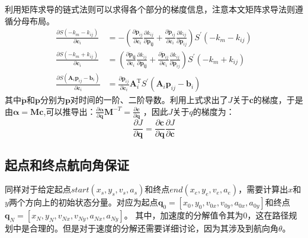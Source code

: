 \documentclass[master,academic]{ysuthesis} %
\begin{document}
		利用矩阵求导的链式法则可以求得各个部分的梯度信息，注意本文矩阵求导法则遵循分母布局。
		\begin{equation}
			\begin{aligned}
				\frac{\partial S( -k_m-k_{ij} )}{\partial \bm{c}_i}&=-( \frac{\partial \dot{\bm{p}}_{ij}}{\partial \bm{c}_i}\frac{\partial k_{ij}}{\partial \bm{\dot{\bm{p}}_{ij}}}+\frac{\partial \ddot{\bm{p}}_{ij}}{\partial \bm{c}_i}\frac{\partial k_{ij}}{\partial \ddot{\bm{p}}_{ij}} ) S^{'} ( -k_m-k_{ij} ) \\
				\frac{\partial S( -k_m+k_{ij} )}{\partial \bm{c}_i}&=( \frac{\partial \bm{\dot{\bm{p}}_{ij}}}{\partial \bm{c}_i}\frac{\partial k_{ij}}{\partial \bm{\dot{\bm{p}}_{ij}}}+\frac{\partial \ddot{\bm{p}}_{ij}}{\partial \bm{c}_i}\frac{\partial k_{ij}}{\partial \ddot{\bm{p}}_{ij}} ) S^{'} ( -k_m+k_{ij} ) \\
				\frac{\partial S( \bm{A}_i\bm{p}_{ij}-\bm{b}_{i} )}{\partial \bm{c}_i}&=\frac{\partial \bm{p}_{ij}}{\partial \bm{c}_i}\bm{A}_{i}^{\mathrm{T}}S^{'}( \bm{A}_i\bm{p}_{ij}-\bm{b}_{i} ) 
			\end{aligned}
		\end{equation}
		其中$\dot{\bm{p}}$和$\ddot{\bm{p}}$分别为$\bm{p}$对时间的一阶、二阶导数。利用上式求出了$J$关于$\bm{c}$的梯度，于是由$\bm{\alpha} = \bm{M}\bm{c}$,可以推导出：$\frac{\partial \bm{\alpha}}{\partial \bm{q}}\bm{M}^{-T}=\frac{\partial \bm{c}}{\partial \bm{q}}$ ，因此$J$关于$q$的梯度为：
		\begin{equation}
			\frac{\partial J}{\partial \bm{q}}=\frac{\partial \bm{c}}{\partial \bm{q}}\frac{\partial J}{\partial \bm{c}}
		\end{equation}

		\newpage
		\vspace*{-1.5em}

		\subsection{起点和终点航向角保证}
		同样对于给定起点$start(x_s,y_s,v_s,a_s)$和终点$end(x_e,y_e,v_e,a_e)$，需要计算出$x$和$y$两个方向上的初始状态分量。对应为起点$\bm{q}_{0}=[x_0,y_0,v_{0x},v_{0y},a_{0x},a_{0y}]$和终点$\bm{q}_{N}=[x_N,y_N,v_{Nx},v_{Ny},a_{Nx},a_{Ny}]$。 其中，加速度的分解值令其为0，这在路径规划中是合理的。但是对于速度的分解还需要详细讨论，因为其涉及到航向角$\theta$。
\end{document}
